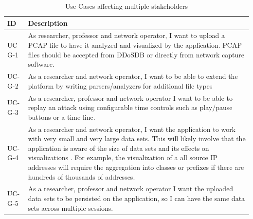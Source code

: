 \begin{table}[]
\centering
\begin{tabular}{|p{1.6cm}|p{12cm}|}
\hline
\textbf{ID} & \textbf{Description} \\ \hline

UC-G-1         & As researcher, professor and network operator, I want to upload a PCAP file to have it analyzed and  visualized by the application. PCAP files should be accepted from DDoSDB or directly from network capture software.\\ \hline
UC-G-2         & As a researcher and network operator, I want to be able to extend the platform by writing parsers/analyzers for additional file types\\ \hline
UC-G-3         & As a researcher, professor and network operator I want to be able to replay an attack using configurable time controls such as play/pause buttons or a time line.\\ \hline
UC-G-4       & As a researcher and network operator, I want the application to work with very small and very large data sets. This will likely involve that the application is aware of the size of data sets and its effects on visualizations \cite{appliedsecurityvisualization}. For example, the visualization of a all source IP addresses will require the aggregation into classes or prefixes if there are hundreds of thousands of addresses.\\ \hline
UC-G-5         & As a researcher, professor and network operator I want the uploaded data sets to be persisted on the application, so I can have the same data sets across multiple sessions.\\ \hline

\end{tabular}
\caption{Use Cases affecting multiple stakeholders}
\label{table:us-general}
\end{table} 

